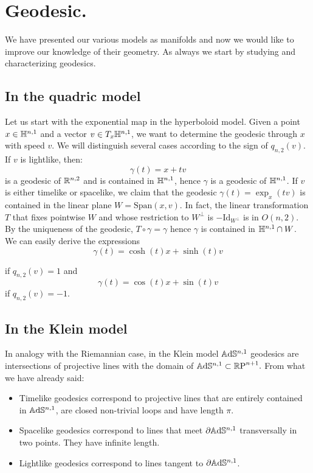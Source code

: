 \section{Geodesic.}
We have presented our various models as manifolds and now we would like to improve our knowledge of their geometry. As always we start by studying and characterizing geodesics.\\ 

\subsection{In the quadric model} Let us start with the exponential map in the hyperboloid model. Given a point $x\in \mathbb{H}^{n,1}$ and a vector $v\in T_x\mathbb{H}^{n,1}$, we want to determine the geodesic through $x$ with speed $v$. We will distinguish several cases according to the sign of $ q_{n,2}(v)$. If $v$ is lightlike, then: 
\[
    \gamma(t)=x+tv
\] is a geodesic of $\mathbb{R}^{n,2}$ and is contained in $\mathbb{H}^{n,1}$, hence $\gamma$ is a geodesic of $\mathbb{H}^{n,1}$. If $v$ is either timelike or spacelike, we claim that the geodesic $\gamma(t)=\exp_x(tv)$ is contained in the linear plane $W=\text{Span}(x,v).$ In fact, the linear transformation $T$ that fixes pointwise $W$ and whose restriction to $W^\perp$ is $-\text{Id}_{W^\perp}$ is in $O(n,2)$. By the uniqueness of the geodesic, $T\circ\gamma=\gamma$ hence $\gamma$ is contained in $\mathbb{H}^{n,1}\cap W$. We can easily derive the expressions\\
\begin{equation}
    \gamma(t)=\cosh(t)x+\sinh(t)v
\end{equation}

if $q_{n,2}(v)=1$ and 
\begin{equation}\label{212}
    \gamma(t)=\cos(t)x+\sin(t)v
\end{equation}
if $q_{n,2}(v)=-1$.\\

\subsection{In the Klein model} In analogy with the Riemannian case, in the Klein model $\mathbb{A}\mathrm{d}\mathbb{S}^{n,1}$ geodesics are intersections of projective lines with the domain of $\mathbb{A}\mathrm{d}\mathbb{S}^{n,1}\subset\mathbb{R} \text{P}^{n+1}.$ From what we have already said: 
\begin{itemize}
    \item Timelike geodesics correspond to projective lines that are entirely contained in $\mathbb{A}\mathrm{d}\mathbb{S}^{n,1}$, are closed non-trivial loops and have length $\pi.$ 
    \item Spacelike geodesics correspond to lines that meet $\partial \mathbb{A}\mathrm{d}\mathbb{S}^{n,1}$ transversally in two points. They have infinite length.
    \item Lightlike geodesics correspond to lines tangent to $\partial\mathbb{A}\mathrm{d}\mathbb{S}^{n,1}$.   
\end{itemize}

